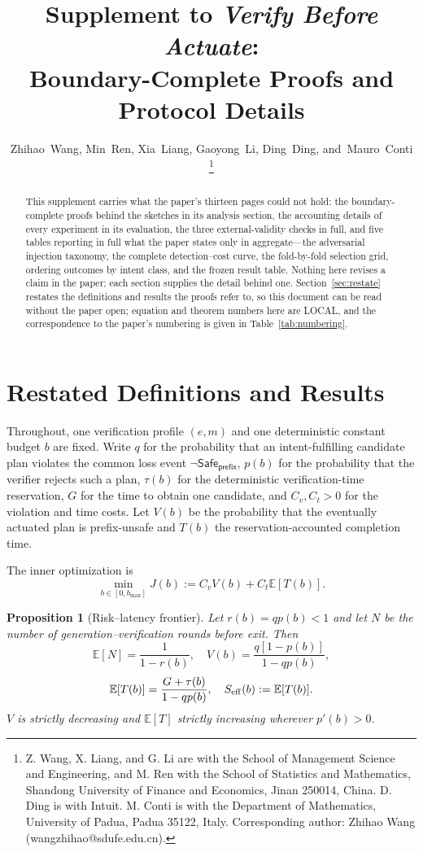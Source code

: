 \documentclass[journal]{IEEEtran}
\title{Supplement to \emph{Verify Before Actuate}:\\
Boundary-Complete Proofs and Protocol Details}
\author{
  Zhihao~Wang,
  Min~Ren,
  Xia~Liang,
  Gaoyong~Li,
  Ding~Ding,
  and~Mauro~Conti
  \thanks{Z. Wang, X. Liang, and G. Li are with the School of Management
  Science and Engineering, and M. Ren with the School of Statistics and
  Mathematics, Shandong University of Finance and Economics, Jinan 250014,
  China.  D. Ding is with Intuit.  M. Conti is with the Department of
  Mathematics, University of Padua, Padua 35122, Italy.  Corresponding
  author: Zhihao Wang (wangzhihao@sdufe.edu.cn).}}
\newtheorem{proposition}{Proposition}
\theoremstyle{definition}
\newcommand{\Safe}{\mathsf{Safe}}
\newcommand{\prefix}{\mathsf{prefix}}
\newcommand{\E}{\mathbb{E}}
\begin{document}
\maketitle

\begin{abstract}
This supplement carries what the paper's thirteen pages could not hold: the
boundary-complete proofs behind the sketches in its analysis section, the
accounting details of every experiment in its evaluation, the three
external-validity checks in full, and five tables reporting in full
what the paper states only in aggregate---the adversarial injection
taxonomy, the complete detection--cost curve, the fold-by-fold selection
grid, ordering outcomes by intent class, and the frozen result table.
Nothing here revises a claim in the paper; each section supplies the detail
behind one.  Section~\ref{sec:restate} restates the definitions and results
the proofs refer to, so this document can be read without the paper open;
equation and theorem numbers here are LOCAL, and the correspondence to the
paper's numbering is given in Table~\ref{tab:numbering}.
\end{abstract}

\section{Restated Definitions and Results}
\label{sec:restate}

Throughout, one verification profile \((e,m)\) and one deterministic constant
budget \(b\) are fixed.  Write \(q\) for the probability that an
intent-fulfilling candidate plan violates the common loss event
\(\neg\Safe_{\prefix}\), \(p(b)\) for the probability that the verifier
rejects such a plan, \(\tau(b)\) for the deterministic verification-time
reservation, \(G\) for the time to obtain one candidate, and \(C_v,C_t>0\)
for the violation and time costs.  Let \(V(b)\) be the probability that the
eventually actuated plan is prefix-unsafe and \(T(b)\) the
reservation-accounted completion time.

The inner optimization is
\begin{equation}
 \min_{b\in[0,b_{\max}]}
 J(b):=C_v V(b)+C_t\E[T(b)] .
\label{eq:objective}
\end{equation}

\begin{proposition}[Risk--latency frontier]
\label{prop:renewal}
Let \(r(b)=qp(b)<1\) and let \(N\) be the number of
generation--verification rounds before exit.  Then
\begin{equation}
 \E[N]=\frac{1}{1-r(b)},\quad
 V(b)=\frac{q[1-p(b)]}{1-qp(b)},
\label{eq:renewal}
\end{equation}
\begin{equation}
 \E[T(b)]=\frac{G+\tau(b)}{1-qp(b)},\quad
 S_{\rm eff}(b):=\E[T(b)].
\label{eq:etime}
\end{equation}
\(V\) is strictly decreasing and \(\E[T]\) strictly increasing wherever
\(p'(b)>0\).
\end{proposition}
\end{document}

